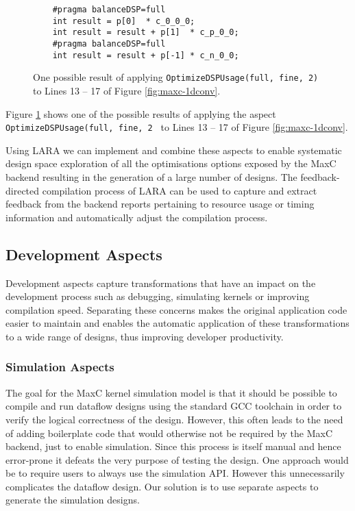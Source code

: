 \begin{figure}
  \begin{lstlisting}
    #pragma balanceDSP=full
    int result = p[0]  * c_0_0_0;
    int result = result + p[1]  * c_p_0_0;
    #pragma balanceDSP=full
    int result = result + p[-1] * c_n_0_0;
  \end{lstlisting}
  \caption{One possible result of applying
    \texttt{OptimizeDSPUsage(full, fine, 2)} to Lines 13 -- 17 of Figure
    \ref{fig:maxc-1dconv}.}
  \label{fig:maxc-1dconv-aspect}
\end{figure}

Figure \ref{fig:maxc-1dconv-aspect} shows one of the possible results
of applying the aspect \texttt{OptimizeDSPUsage(full, fine, 2 } to
Lines 13 -- 17 of Figure \ref{fig:maxc-1dconv}.

Using LARA we can implement and combine these aspects to enable
systematic design space exploration of all the optimisations options
exposed by the MaxC backend resulting in the generation of a large
number of designs. The feedback-directed compilation process of LARA can
be used to capture and extract feedback from the backend reports
pertaining to resource usage or timing information and automatically
adjust the compilation process.

\subsection{Development Aspects}

Development aspects capture transformations that have an impact on the
development process such as debugging, simulating kernels or improving
compilation speed. Separating these concerns makes the original
application code easier to maintain and enables the automatic
application of these transformations to a wide range of designs, thus
improving developer productivity.

\subsubsection{Simulation Aspects}

The goal for the MaxC kernel simulation model is that it should be
possible to compile and run dataflow designs using the standard GCC
toolchain in order to verify the logical correctness of the
design. However, this often leads to the need of adding boilerplate
code that would otherwise not be required by the MaxC backend, just to
enable simulation. Since this process is itself manual and hence
error-prone it defeats the very purpose of testing the design. One
approach would be to require users to always use the simulation
API. However this unnecessarily complicates the dataflow design. Our
solution is to use separate aspects to generate the simulation
designs.

